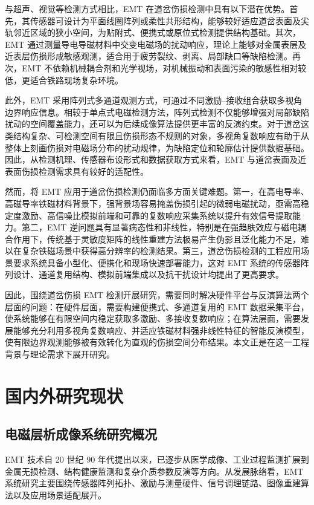 与超声、视觉等检测方式相比，EMT 在道岔伤损检测中具有以下潜在优势。首先，其传感器可设计为平面线圈阵列或柔性共形结构，能够较好适应道岔表面及尖轨邻近区域的狭小空间，为贴附式、便携式或原位式检测提供结构基础。其次，EMT 通过测量导电导磁材料中交变电磁场的扰动响应，理论上能够对金属表层及近表层伤损形成敏感观测，适合用于疲劳裂纹、剥离、局部缺口等缺陷检测。再次，EMT 不依赖机械耦合剂和光学视场，对机械振动和表面污染的敏感性相对较低，更适合铁路现场复杂环境。

此外，EMT 采用阵列式多通道观测方式，可通过不同激励--接收组合获取多视角边界响应信息。相较于单点式电磁检测方法，阵列式检测不仅能够增强对局部缺陷扰动的空间覆盖能力，还可以为后续成像算法提供更丰富的反演约束。对于道岔这类结构复杂、可检测空间有限且伤损形态不规则的对象，多视角复数响应有助于从整体上刻画伤损对电磁场分布的扰动规律，为缺陷定位和轮廓估计提供数据基础。因此，从检测机理、传感器布设形式和数据获取方式来看，EMT 与道岔表面及近表面伤损检测需求具有较好的适配性。

然而，将 EMT 应用于道岔伤损检测仍面临多方面关键难题。第一，在高电导率、高磁导率铁磁材料背景下，强背景场容易掩盖伤损引起的微弱电磁扰动，亟需高稳定度激励、高信噪比模拟前端和可靠的复数响应采集系统以提升有效信号提取能力。第二，EMT 逆问题具有显著病态性和非线性，特别是在强趋肤效应与磁电耦合作用下，传统基于灵敏度矩阵的线性重建方法极易产生伪影且泛化能力不足，难以在复杂铁磁场景中获得高分辨率的检测结果。第三，道岔伤损检测的工程应用场景要求系统具备小型化、便携化和现场快速部署能力，这对 EMT 系统的传感器阵列设计、通道复用结构、模拟前端集成以及抗干扰设计均提出了更高要求。

因此，围绕道岔伤损 EMT 检测开展研究，需要同时解决硬件平台与反演算法两个层面的问题：在硬件层面，需要构建便携式、多通道复用的 EMT 数据采集平台，使系统能够在有限空间内稳定获取多激励、多接收复数响应；在算法层面，需要发展能够充分利用多视角复数响应、并适应铁磁材料强非线性特征的智能反演模型，使有限边界观测能够被有效转化为直观的伤损空间分布结果。本文正是在这一工程背景与理论需求下展开研究。

\section{国内外研究现状}

	\subsection{电磁层析成像系统研究概况}
 
EMT 技术自 20 世纪 90 年代提出以来，已逐步从医学成像、工业过程监测扩展到金属无损检测、结构健康监测和复杂介质参数反演等方向。从发展脉络看，EMT 系统研究主要围绕传感器阵列拓扑、激励与测量硬件、信号调理链路、图像重建算法以及应用场景适配展开。
 
